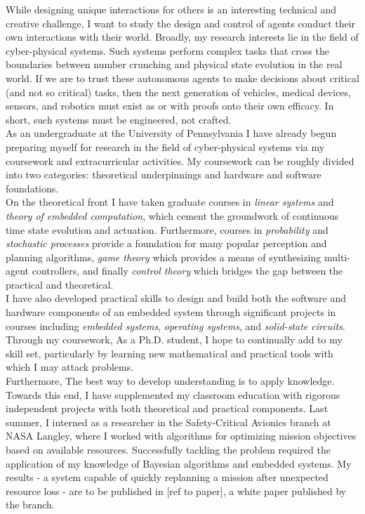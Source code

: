 \documentclass[]{article}
\begin{document}
While designing unique interactions for others is an interesting technical and creative challenge, I want to study the design and control of agents conduct their own interactions with their world. Broadly, my research interests lie in the field of cyber-physical systems. Such systems perform complex tasks that cross the boundaries between number crunching and physical state evolution in the real world. If we are to trust these autonomous agents to make decisions about critical (and not so critical) tasks, then the next generation of vehicles, medical devices, sensors, and robotics must exist as or with proofs onto their own efficacy. In short, such systems must be engineered, not crafted.\\

As an undergraduate at the University of Pennsylvania I have already begun preparing myself for research in the field of cyber-physical systems via my coursework and extracurricular activities. My coursework can be roughly divided into two categories: theoretical underpinnings and hardware and software foundations.\\

On the theoretical front I have taken graduate courses in \textit{linear systems} and \textit{theory of embedded computation}, which cement the groundwork of continuous time state evolution and actuation. Furthermore, courses in \textit{probability} and \textit{stochastic processes} provide a foundation for many popular perception and planning algorithms, \textit{game theory} which provides a means of synthesizing multi-agent controllers, and finally  \textit{control theory} which bridges the gap between the practical and theoretical.\\

I have also developed practical skills to design and build both the software and hardware components of an embedded system through significant projects in courses including \textit{embedded systems}, \textit{operating systems}, and \textit{solid-state circuits}. Through my coursework,  As a Ph.D. student, I hope to continually add to my skill set, particularly by learning new mathematical and practical tools with which I may attack problems.\\

Furthermore, The best way to develop understanding is to apply knowledge. Towards this end, I have supplemented my classroom education with rigorous independent projects with both theoretical and practical components. Last summer, I interned as a researcher in the Safety-Critical Avionics branch at NASA Langley, where I worked with algorithms for optimizing mission objectives based on available resources. Successfully tackling the problem required the application of my knowledge of Bayesian algorithms and embedded systems. My results - a system capable of quickly replanning a mission after unexpected resource loss - are to be published in [ref to paper], a white paper published by the branch.\\
\end{document}
